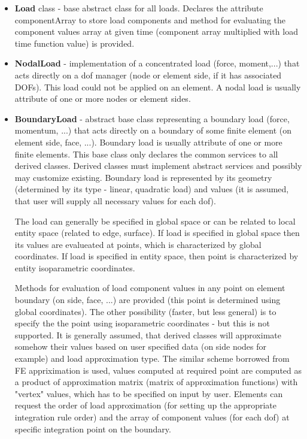 \documentclass[a4paper]{article}
\newcommand{\class}[1]{{\bf #1}}
\newcommand{\attribute}[1]{#1}
\begin{document}
\begin{itemize}
\item
\class{Load} class - base abstract class for all loads. Declares the
attribute \attribute{componentArray} to store load components and
method for evaluating the component values array at given time (component array multiplied
with load time function value) is provided.
\item
\class{NodalLoad} - implementation of a concentrated load (force,
moment,...) that acts directly on a dof manager (node or element
side, if it has associated DOFs). 
This load could not be applied on an element. A nodal load is usually attribute of
one or more nodes or element sides.
\item
\class{BoundaryLoad} - abstract base class representing a boundary
load (force, momentum, ...) that acts directly on a boundary of some
finite element (on element side, face, ...). Boundary load is usually
attribute of one or more finite elements. This base class only
declares the common services to all derived classes. Derived
classes must implement abstract services and possibly may customize
existing. Boundary load is represented by its geometry (determined by
its type - linear, quadratic load) and values (it is assumed, that
user will supply all necessary values for each dof).

The load can generally be specified in global space or can be related
to local entity space (related to edge, surface). If load is specified
in global space then its values are evalueated at points, which is
characterized by global coordinates. If load is specified in entity
space, then point is characterized by entity isoparametric
coordinates.

Methods for evaluation of load component values in any point on
element boundary (on side, face, ...) are provided (this point is
determined using global coordinates). The other  possibility (faster, but less general) is to
specify the the point using isoparametric coordinates - but this is
not supported. It is generally assumed, that derived classes will
approximate somehow their values based on user  specified data (on
side nodes for example) and load approximation type. The similar
scheme borrowed from FE  appriximation is used, values computed at
required point are computed as a product of approximation matrix
(matrix of approximation functions) with "vertex" values, which has to
be specified on input by user. Elements can request the order of load
approximation (for setting up the appropriate integration rule order)
and the array of component values (for each dof) at specific
integration point on the boundary. 



\end{itemize}
\end{document}
